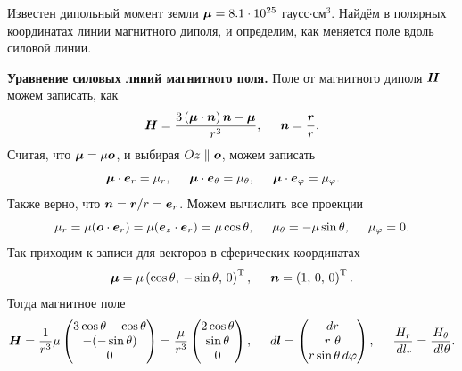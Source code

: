 
Известен дипольный момент земли $\mbox{\boldmath $\mu$} = 8.1 \cdot 10^{25}$  гаусс$\cdot$см$^3$. Найдём в полярных координатах линии магнитного диполя, и определим, как меняется поле вдоль силовой линии. 


\textbf{Уравнение силовых линий магнитного поля.}
Поле от магнитного диполя $\mbox{\boldmath $H$}$ можем записать, как
\begin{equation*}
    \mbox{\boldmath $H$} = \frac{3 \left(\mbox{\boldmath $\mu$} \cdot \mbox{\boldmath $n$}\right) \mbox{\boldmath $n$} - \mbox{\boldmath $\mu$}}{r^3},
    \hspace{5 mm} 
    \mbox{\boldmath $n$} = \frac{\mbox{\boldmath $r$}}{r}.
\end{equation*}
Считая, что $\mbox{\boldmath $\mu$} = \mu \mbox{\boldmath $o$}$, и выбирая $Oz \parallel \mbox{\boldmath $o$}$, можем записать
\begin{equation*}
    \mbox{\boldmath $\mu$} \cdot \mbox{\boldmath $e$}_r = \mu_r, \hspace{5 mm} 
    \mbox{\boldmath $\mu$} \cdot \mbox{\boldmath $e$}_\theta = \mu_\theta, \hspace{5 mm} 
    \mbox{\boldmath $\mu$} \cdot \mbox{\boldmath $e$}_\varphi = \mu_\varphi. \hspace{5 mm} 
\end{equation*}
Также верно, что $\mbox{\boldmath $n$} = \mbox{\boldmath $r$} / r = \mbox{\boldmath $e$}_r$. Можем вычислить все проекции
\begin{equation*}
    \mu_r = \mu  (\mbox{\boldmath $o$} \cdot \mbox{\boldmath $e$}_r) = \mu (\mbox{\boldmath $e$}_z \cdot \mbox{\boldmath $e$}_r) = \mu \cos \theta,
    \hspace{5 mm} 
    \mu_\theta = - \mu \sin \theta, 
    \hspace{5 mm} 
    \mu_\varphi = 0.
\end{equation*}
Так приходим к записи для векторов в сферических координатах
\begin{equation*}
    \mbox{\boldmath $\mu$} =  \mu \left(\cos \theta,\, -\sin\theta,\, 0\right)^{\text{T}},
    \hspace{5 mm} 
    \mbox{\boldmath $n$}  = \left(1,\, 0,\, 0\right)^{\text{T}}.
\end{equation*}
Тогда магнитное поле
\begin{equation*}
    \mbox{\boldmath $H$} = \frac{1}{r^3}\mu \begin{pmatrix}
        3 \cos \theta - \cos \theta \\
        - (-\sin \theta) \\
        0
    \end{pmatrix} = \frac{\mu}{r^3} \begin{pmatrix}
        2 \cos \theta \\ \sin \theta \\ 0
    \end{pmatrix},
    \hspace{5 mm} 
    d \mbox{\boldmath $l$} = \begin{pmatrix}
        dr \\  r \ \theta \\ r \sin \theta \, d \varphi
    \end{pmatrix},
    \hspace{5 mm}
    \frac{H_r}{\, d l_r} = \frac{H_\theta}{\, d l \theta}.
\end{equation*}
